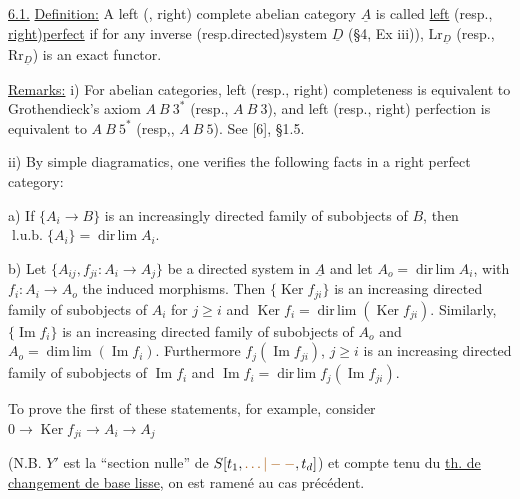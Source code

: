 \uline{6.1.} \uline{Definition:} A left (\uline{}, right) complete abelian
category $\underline{A}$ is called \uline{left} (resp., \uline{right})\uline{perfect} if for any inverse
(resp.directed)system $\underline{D}$ (\S 4, Ex iii)), $\mathrm{Lr}_{\underline{D}}$ (resp., $\mathrm{Rr}_{\underline{D}}$) is an exact
functor.

\uline{Remarks:} i) For abelian categories, left (resp., right)
completeness is equivalent to Grothendieck's axiom $A\ B\ 3^*$
(resp., $A\ B\ 3$), and left (resp., right) perfection is equivalent
to $A\ B\ 5^*$ (resp,, $A\ B\ 5$). See [6], \S 1.5.

ii) By simple diagramatics, one verifies the following
facts in a right perfect category:

a) If $\{A_i\longrightarrow B\}$ is an increasingly directed family of
subobjects of $B$, then $\operatorname{l.u.b.}\{A_i\}=\operatorname{dir\,lim}A_i$.

b) Let $\{A_{ij},f_{ji}:A_i\longrightarrow A_j\}$ be a directed system in $\underline{A}$
and let $A_o=\operatorname{dir\,lim}A_i$, with $f_i:A_i\longrightarrow A_o$ the induced morphisms.
Then $\{\operatorname{Ker}f_{ji}\}$ is an increasing directed family of subobjects
of $A_i$ for $j\geq i$ and $\operatorname{Ker}f_i=\operatorname{dir\,lim}(\operatorname{Ker}f_{ji})$. Similarly,
$\{\operatorname{Im}f_i\}$ is an increasing directed family of subobjects of
$A_o$ and $A_o=\operatorname{dim\,lim}(\operatorname{Im}f_i)$. Furthermore $f_j(\operatorname{Im}f_{ji})$, $j\geq i$ is
an increasing directed family of subobjects of $\operatorname{Im}f_i$ and
$\operatorname{Im}f_i=\operatorname{dir\,lim}f_j(\operatorname{Im}f_{ji})$.

To prove the first of these statements, for example,
consider $0\longrightarrow\operatorname{Ker}f_{ji}\longrightarrow A_i\longrightarrow A_j$


(N.B. $Y'$ est la ``section nulle'' de $S[t_1,\unsure{\ldots|--},t_d]$)
et compte tenu du \uline{th. de changement de base lisse},
on est ramené au cas précédent.

